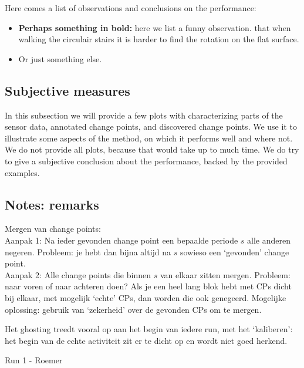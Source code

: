 
Here comes a list of observations and conclusions on the performance:
\begin{itemize}
  \item \textbf{Perhaps something in bold:} here we list a funny observation.
  \eg that when walking the circulair stairs it is harder to find the rotation on the flat surface.
  \item Or just something else.
\end{itemize}

\subsection{Subjective measures}
In this subsection we will provide a few plots with characterizing parts of the sensor data, annotated change points, and discovered change points.
We use it to illustrate some aspects of the method, on which it performs well and where not.
We do not provide all plots, because that would take up to much time.
We do try to give a subjective conclusion about the performance, backed by the provided examples.


\subsection{Notes: remarks}
Mergen van change points:\\

Aanpak 1: Na ieder gevonden change point een bepaalde periode $s$ alle anderen negeren. Probleem: je hebt dan bijna altijd na $s$ sowieso een `gevonden' change point.\\
Aanpak 2: Alle change points die binnen $s$ van elkaar zitten mergen. Probleem: naar voren of naar achteren doen? Als je een heel lang blok hebt met CPs dicht bij elkaar, met mogelijk `echte' CPs, dan worden die ook genegeerd. Mogelijke oplossing: gebruik van `zekerheid' over de gevonden CPs om te mergen.

Het ghosting treedt vooral op aan het begin van iedere run, met het `kaliberen': het begin van de echte activiteit zit er te dicht op en wordt niet goed herkend.

Run 1 - Roemer\\

